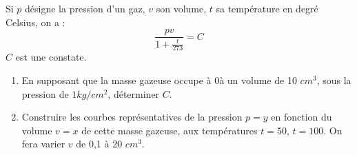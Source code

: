 
Si $p$ désigne la pression d'un gaz, $v$ son volume, $t$ sa température en degré Celsius, on a :$$ \frac{pv}{1+\frac{t}{273}}=C$$ $C$ est une constate.
\begin{enumerate}
\item En supposant que la masse gazeuse occupe à 0\deg à un volume de 10 $cm^3$, sous la pression de $1 kg/cm^2$, déterminer $C$.
\item Construire les courbes représentatives de la pression $p=y$ en fonction du volume $v=x$ de cette masse gazeuse, aux températures $t=50$\deg, $t=100$\deg. On fera varier $v$ de 0,1 à 20 $cm^3$.
\end{enumerate}